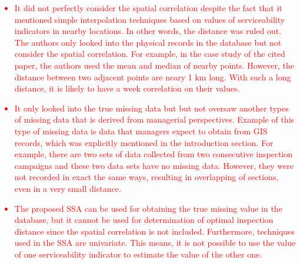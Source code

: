 \documentclass[Journal]{ascelike}
\begin{document}
\textcolor{red}{\begin{itemize}
 \item It did not perfectly consider the spatial correlation despite the fact that it mentioned simple interpolation techniques based on values of serviceability indicators in nearby locations. In other words, the distance was ruled out. The authors only looked into the physical records in the database but not consider the spatial correlation. For example, in the case study of the cited paper, the authors used the mean and median of nearby points. However, the distance between two adjacent points are neary 1 km long. With such a long distance, it is likely to have a week correlation on their values.
 \item It only looked into the true missing data but but not oversaw another types of missing data that is derived from managerial perspectives. Example of this type of missing data is data that managers expect to obtain from GIS records, which was explicitly mentioned in the introduction section. For example, there are two sets of data collected from two consecutive inspection campaigns and these two data sets have no missing data. However, they were not recorded in exact the same ways, resulting in overlapping of sections, even in a very small distance. 
 \item The proposed SSA can be used for obtaining the true missing value in the database, but it cannot be used for determination of optimal inspection distance since the spatial correlation is not included. Furthermore, techniques used in the SSA are univariate. This means, it is not possible to use the value of one serviceability indicator to estimate the value of the other one. 
\end{itemize}}
\end{document}
